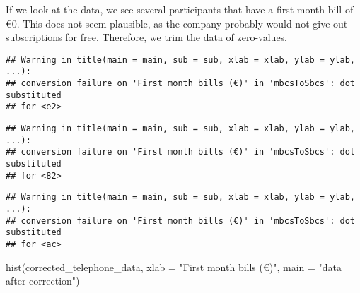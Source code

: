 \documentclass[
]{article}
\newenvironment{Shaded}{\begin{snugshade}}{\end{snugshade}}
\newcommand{\AttributeTok}[1]{\textcolor[rgb]{0.77,0.63,0.00}{#1}}
\newcommand{\CommentTok}[1]{\textcolor[rgb]{0.56,0.35,0.01}{\textit{#1}}}
\newcommand{\ControlFlowTok}[1]{\textcolor[rgb]{0.13,0.29,0.53}{\textbf{#1}}}
\newcommand{\DecValTok}[1]{\textcolor[rgb]{0.00,0.00,0.81}{#1}}
\newcommand{\FunctionTok}[1]{\textcolor[rgb]{0.00,0.00,0.00}{#1}}
\newcommand{\NormalTok}[1]{#1}
\newcommand{\OtherTok}[1]{\textcolor[rgb]{0.56,0.35,0.01}{#1}}
\newcommand{\SpecialCharTok}[1]{\textcolor[rgb]{0.00,0.00,0.00}{#1}}
\newcommand{\StringTok}[1]{\textcolor[rgb]{0.31,0.60,0.02}{#1}}
\begin{document}
If we look at the data, we see several participants that have a first
month bill of €0. This does not seem plausible, as the company probably
would not give out subscriptions for free. Therefore, we trim the data
of zero-values.

\begin{Shaded}
\end{Shaded}

\begin{verbatim}
## Warning in title(main = main, sub = sub, xlab = xlab, ylab = ylab, ...):
## conversion failure on 'First month bills (€)' in 'mbcsToSbcs': dot substituted
## for <e2>
\end{verbatim}

\begin{verbatim}
## Warning in title(main = main, sub = sub, xlab = xlab, ylab = ylab, ...):
## conversion failure on 'First month bills (€)' in 'mbcsToSbcs': dot substituted
## for <82>
\end{verbatim}

\begin{verbatim}
## Warning in title(main = main, sub = sub, xlab = xlab, ylab = ylab, ...):
## conversion failure on 'First month bills (€)' in 'mbcsToSbcs': dot substituted
## for <ac>
\end{verbatim}

\begin{Shaded}
\begin{Highlighting}[]
\FunctionTok{hist}\NormalTok{(corrected\_telephone\_data, }\AttributeTok{xlab =} \StringTok{"First month bills (€)"}\NormalTok{, }\AttributeTok{main =} \StringTok{"data after correction"}\NormalTok{)}
\end{Highlighting}
\end{Shaded}
\end{document}
